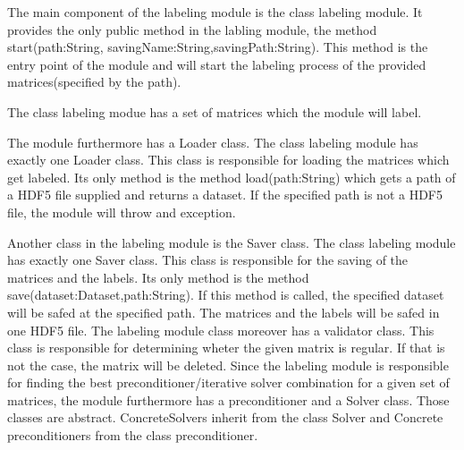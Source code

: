 \documentclass[parskip=full]{scrartcl}
\begin{document}
\newpage
\begin{figure}[h]
\begin{center}

\label{Labeling Module}
\end{center}
\end{figure}
\newpage

The main component of the labeling module is the class labeling module.
It provides the only public method in the labling module, the method start(path:String, savingName:String,savingPath:String).
This method is the entry point of the module and will start the labeling process of the provided matrices(specified by the path). \newline\newline

The class labeling modue has a set of matrices which the module will label.\newline\newline

The module furthermore has a Loader class. The class labeling module has exactly one Loader class.
This class is responsible for loading the matrices which get labeled.
Its only method is the method load(path:String) which gets a path of a \gls{HDF5} file supplied and returns a dataset.
If the specified path is not a \gls{HDF5} file, the module will throw and exception. \newline\newline

Another class in the labeling module is the Saver class.
The class labeling module has exactly one Saver class.
This class is responsible for the saving of the matrices and the \glspl{label}.
Its only method is the method save(dataset:Dataset,path:String).
If this method is called, the specified dataset will be safed at the specified path.
The matrices and the \glspl{label} will be safed in one \gls{HDF5} file.\newline
\newline
The labeling module class moreover has a validator class.
This class is responsible for determining wheter the given matrix is regular.
If that is not the case, the matrix will be deleted.
\newline\newline
Since the labeling module is responsible for finding the best \gls{preconditioner}/\gls{iterative solver} combination for a given set of matrices, the module furthermore has a \gls{preconditioner} and a Solver class.
Those classes are abstract. ConcreteSolvers inherit from the class Solver and Concrete \glspl{preconditioner} from the class \gls{preconditioner}.\newline\newline
\end{document}

